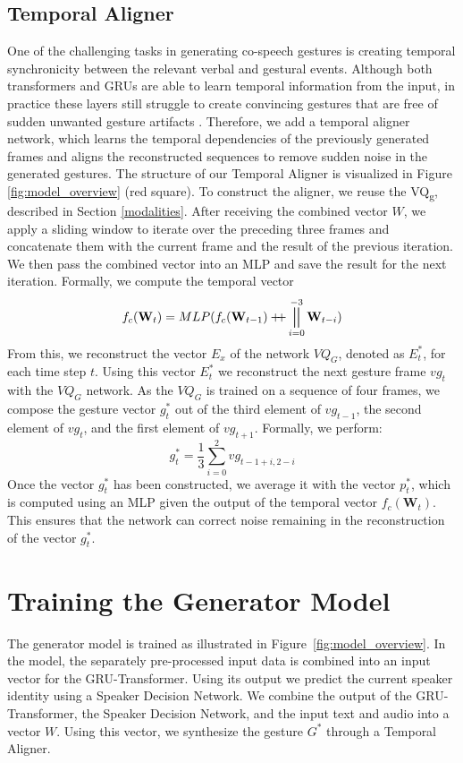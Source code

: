 \documentclass[sigconf]{acmart}
\DeclareMathOperator*{\concat}{\scalerel*{\Vert}{\sum}}
\begin{document}
\subsection{Temporal Aligner}
One of the challenging tasks in generating co-speech gestures is creating temporal synchronicity between the relevant verbal and gestural events. Although both transformers and GRUs are able to learn temporal information from the input, in practice these layers still struggle to create convincing gestures that are free of sudden unwanted gesture artifacts \cite{liuLearningHierarchicalCrossModal2022a,fan2020addressing}. Therefore, we add a temporal aligner network, which learns the temporal dependencies of the previously generated frames and aligns the reconstructed sequences to remove sudden noise in the generated gestures. The structure of our Temporal Aligner is visualized in Figure \ref{fig:model_overview} (red square). To construct the aligner, we reuse the VQ\textsubscript{g}, described in Section \ref{modalities}. After receiving the combined vector $W$, we apply a sliding window to iterate over the preceding three frames and concatenate them with the current frame and the result of the previous iteration. We then pass the combined vector into an MLP and save the result for the next iteration. Formally, we compute the temporal vector
\begin{equation}
    f_c(\mathbf{W}_t) = MLP(f_c(\mathbf{W}_{t-1}) +\!\!\!+ \concat_{i=0}^{-3} \mathbf{W}_{t-i}   )
\end{equation}
From this, we reconstruct the vector $E_x$ of the network $VQ_G$, denoted as $E^*_t$, for each time step $t$. Using this vector $E^*_t$ we reconstruct the next gesture frame $vg_t$ with the $VQ_G$ network. As the $VQ_G$ is trained on a sequence of four frames, we compose the gesture vector $g^*_t$ out of the 
third element of $vg_{t-1}$, the second element of $vg_{t}$, and the first element of $vg_{t+1}$. Formally, we perform:
\begin{equation} \label{eq:1}
g^*_t = \frac{1}{3}\sum_{i=0}^2 vg_{t-1+i,2-i}
\end{equation}
Once the vector $g^*_t$ has been constructed, we average it with the vector $p^*_t$, which is computed using an MLP given the output of the temporal vector $f_c(\mathbf{W}_t)$. This ensures that the network can correct noise remaining in the reconstruction of the vector $g^*_t$.
 
 
\section{Training the Generator Model} \label{training_proc}
The generator model is trained as illustrated in Figure~\ref{fig:model_overview}. In the model, the separately pre-processed input data is combined into an input vector for the GRU-Transformer. Using its output we predict the current speaker identity using a Speaker Decision Network. We combine the output of the GRU-Transformer, the Speaker Decision Network, and the input text and audio into a vector $W$. Using this vector, we synthesize the gesture $G^*$ through a Temporal Aligner. 
\end{document}
